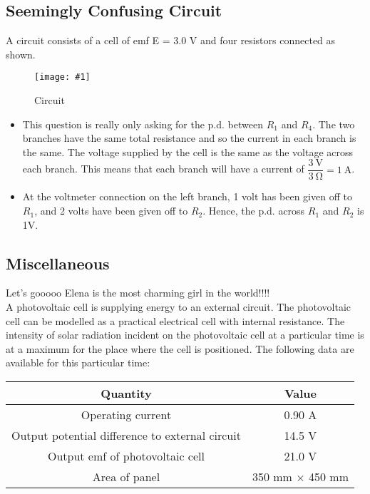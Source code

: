 \documentclass[a4paper,12pt]{article}
\newcommand{\lb}{\\[8pt]}
\newcommand{\img}[4]{\begin{center}
  \begin{figure}[H]
    \centering
    \texttt{[image: \#1]}
    \caption{#3}
    \label{fig:#4}
  \end{figure}
\end{center}}
\begin{document}
\pagebreak

\subsection{Seemingly Confusing Circuit}

A circuit consists of a cell of emf E = 3.0 V and four resistors connected as shown.

\img{ex/19.png}{0.5}{Circuit}{ex19}

\begin{itemize}
  \item This question is really only asking for the p.d. between $R_1$ and $R_4$. The two branches have the same total resistance and so the current in each branch is the same. The voltage supplied by the cell is the same as the voltage across each branch. This means that each branch will have a current of $\dfrac{\SI{3}{\V}}{\SI{3}{\ohm}} = \SI{1}{\A}$.
  \item At the voltmeter connection on the left branch, 1 volt has been given off to $R_1$, and 2 volts have been given off to $R_2$. Hence, the p.d. across $R_1$ and $R_2$ is 1V.
\end{itemize}

\pagebreak

\subsection{Miscellaneous}

Let's gooooo Elena is the most charming girl in the world!!!!\lb

A photovoltaic cell is supplying energy to an external circuit. The photovoltaic cell can be modelled as a practical electrical cell with internal resistance.
The intensity of solar radiation incident on the photovoltaic cell at a particular time is at a maximum for the place where the cell is positioned.
The following data are available for this particular time:
\begin{table}[H]
  \centering

  \begin{tabular}{|c|c|}
    \hline
    \textbf{Quantity}                               & \textbf{Value}         \\ \hline
    Operating current                               & 0.90 A                 \\ \hline
    Output potential difference to external circuit & 14.5 V                 \\ \hline
    Output emf of photovoltaic cell                 & 21.0 V                 \\ \hline
    Area of panel                                   & 350 mm $\times$ 450 mm \\ \hline
  \end{tabular}
\end{table}
\end{document}
